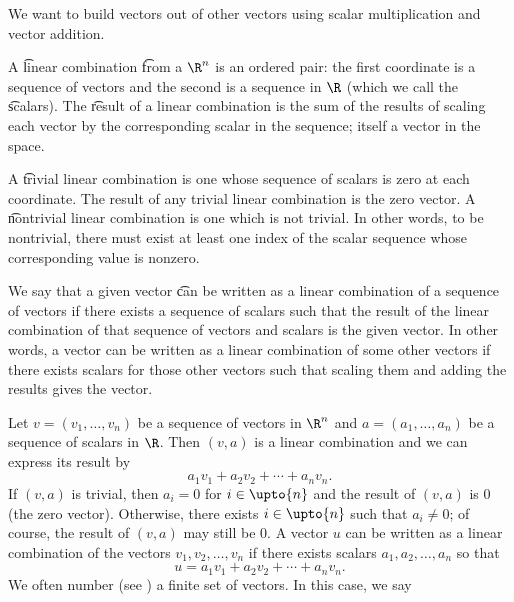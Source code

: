 

We want to build vectors out of other vectors using scalar multiplication and vector addition.


A \t{linear combination} \t{from} a $\R ^n$ is an ordered pair: the first coordinate is a sequence of vectors and the second is a sequence in $\R $ (which we call the \t{scalars}).
The \t{result} of a linear combination is the sum of the results of scaling each vector by the corresponding scalar in the sequence; itself a vector in the space.

A \t{trivial linear combination} is one whose sequence of scalars is zero at each coordinate.
The result of any trivial linear combination is the zero vector.
A \t{nontrivial linear combination} is one which is not trivial.
In other words, to be nontrivial, there must exist at least one index of the scalar sequence whose corresponding value is nonzero.

We say that a given vector \t{can be written as a linear combination of} a sequence of vectors if there exists a sequence of scalars such that the result of the linear combination of that sequence of vectors and scalars is the given vector.
In other words, a vector can be written as a linear combination of some other vectors if there exists scalars for those other vectors such that scaling them and adding the results gives the vector.


Let $v = (v_1, \dots , v_n)$ be a sequence of vectors in $\R ^n$ and
$a = (a_1, \dots , a_n)$ be a sequence of scalars in $\R $.
Then $(v, a)$ is a linear combination and we can express its result by
  \[
a_1v_1 + a_2v_2 + \cdots + a_n v_n.
  \]
If $(v,a)$ is trivial, then $a_i = 0$ for $i \in \upto{n}$ and the result of $(v, a)$ is $0$ (the zero vector).
Otherwise, there exists $i \in \upto{n}$ such that $a_i \neq 0$; of course, the result of $(v, a)$ may still be $0$.
A vector $u$ can be written as a linear combination of the vectors $v_1, v_2, \dots , v_n$ if there exists scalars $a_1, a_2, \dots , a_n$ so that
    \[
u = a_1v_1 + a_2v_2 + \cdots + a_nv_n.
    \]
We often number (see ) a finite set of vectors.
In this case, we say 

